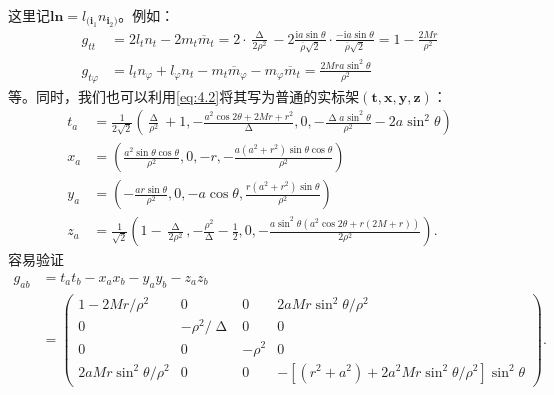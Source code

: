 这里记$\boldsymbol{ln} =l_{(\boldsymbol{i}_{1}} n_{\boldsymbol{i}_{2})}$。例如：
\begin{equation*}
	\begin{aligned}
		g_{tt} & =2l_{t} n_{t} -2m_{t}\overline{m}_{t} =2\cdot \frac{\upDelta }{2\rho ^{2}} -2\frac{\mathrm{i} a\sin \theta }{\overline{\rho }\sqrt{2}} \cdot \frac{-\mathrm{i} a\sin \theta }{\overline{\rho }\sqrt{2}} =1-\frac{2Mr}{\rho ^{2}}\\
		g_{t\varphi } & =l_{t} n_{\varphi } +l_{\varphi } n_{t} -m_{t}\overline{m}_{\varphi } -m_{\varphi }\overline{m}_{t} =\frac{2Mra\sin^{2} \theta }{\rho ^{2}}
	\end{aligned}
\end{equation*}
等。同时，我们也可以利用\ref{eq:4.2}将其写为普通的实标架$(\boldsymbol{t} ,\boldsymbol{x} ,\boldsymbol{y} ,\boldsymbol{z})$：
\begin{equation*}
	\begin{aligned}
		t_{a} & =\frac{1}{2\sqrt{2}}\left(\frac{\upDelta }{\rho ^{2}} +1,-\frac{a^{2}\cos 2\theta +2Mr+r^{2}}{\upDelta } ,0,-\frac{\upDelta a\sin^{2} \theta }{\rho ^{2}} -2a\sin^{2} \theta \right)\\
		x_{a} & =\left(\frac{a^{2}\sin \theta \cos \theta }{\rho ^{2}} ,0,-r,-\frac{a(a^{2} +r^{2} )\sin \theta \cos \theta }{\rho ^{2}}\right)\\
		y_{a} & =\left( -\frac{ar\sin \theta }{\rho ^{2}} ,0,-a\cos \theta ,\frac{r(a^{2} +r^{2} )\sin \theta }{\rho ^{2}}\right)\\
		z_{a} & =\frac{1}{\sqrt{2}}\left( 1-\frac{\upDelta }{2\rho ^{2}} ,-\frac{\rho ^{2}}{\upDelta } -\frac{1}{2} ,0,-\frac{a\sin^{2} \theta (a^{2}\cos 2\theta +r(2M+r))}{2\rho ^{2}}\right) .
	\end{aligned}
\end{equation*}
容易验证
\begin{equation*}
	\begin{aligned}
		g_{ab} & =t_{a} t_{b} -x_{a} x_{b} -y_{a} y_{b} -z_{a} z_{b}\\
		& =\begin{pmatrix}
			1-2Mr/\rho ^{2} & 0 & 0 & 2aMr\sin^{2} \theta /\rho ^{2}\\
			0 & -\rho ^{2} /\upDelta  & 0 & 0\\
			0 & 0 & -\rho ^{2} & 0\\
			2aMr\sin^{2} \theta /\rho ^{2} & 0 & 0 & -[(r^{2} +a^{2} )+2a^{2} Mr\sin^{2} \theta /\rho ^{2} ]\sin^{2} \theta 
		\end{pmatrix} .
	\end{aligned}
\end{equation*}
